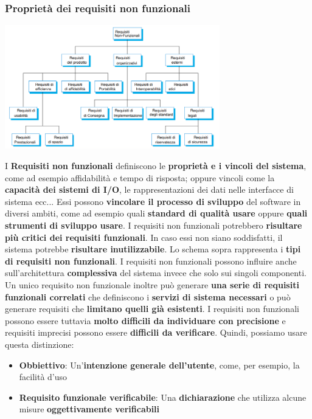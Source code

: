 \documentclass[12pt]{article}
\begin{document}
\subsubsection{Proprietà dei requisiti non funzionali}
\begin{center}
    \includegraphics[width = 0.70\textwidth]{Images/28.png}
\end{center}
I \textbf{Requisiti non funzionali} definiscono le \textbf{proprietà e i vincoli del sistema}, come ad esempio affidabilità e tempo di risposta; oppure vincoli come la \textbf{capacità dei sistemi di I/O}, le rappresentazioni dei dati nelle interfacce di sistema ecc...
Essi possono \textbf{vincolare il processo di sviluppo} del software in diversi ambiti, come ad esempio quali \textbf{standard di qualità usare} oppure \textbf{quali strumenti di sviluppo usare}.
I requisiti non funzionali potrebbero \textbf{risultare più critici dei requisiti funzionali}. In caso essi non siano soddisfatti, il sistema potrebbe \textbf{risultare inutilizzabile}.
Lo schema sopra rappresenta i \textbf{tipi di requisiti non funzionali}. I requisiti non funzionali possono influire anche sull'architettura \textbf{complessiva} del sistema invece che solo sui singoli componenti.
Un unico requisito non funzionale inoltre può generare \textbf{una serie di requisiti funzionali correlati} che definiscono i \textbf{servizi di sistema necessari} o può generare requisiti che \textbf{limitano quelli già esistenti}.
I requisiti non funzionali possono essere tuttavia \textbf{molto difficili da individuare con precisione} e requisiti imprecisi possono essere \textbf{difficili da verificare}. Quindi, possiamo usare questa distinzione:
\begin{itemize}
    \item \textbf{Obbiettivo}: Un'\textbf{intenzione generale dell'utente}, come, per esempio, la facilità d'uso
    \item \textbf{Requisito funzionale verificabile}: Una \textbf{dichiarazione} che utilizza alcune misure \textbf{oggettivamente verificabili}
\end{itemize}
\end{document}

